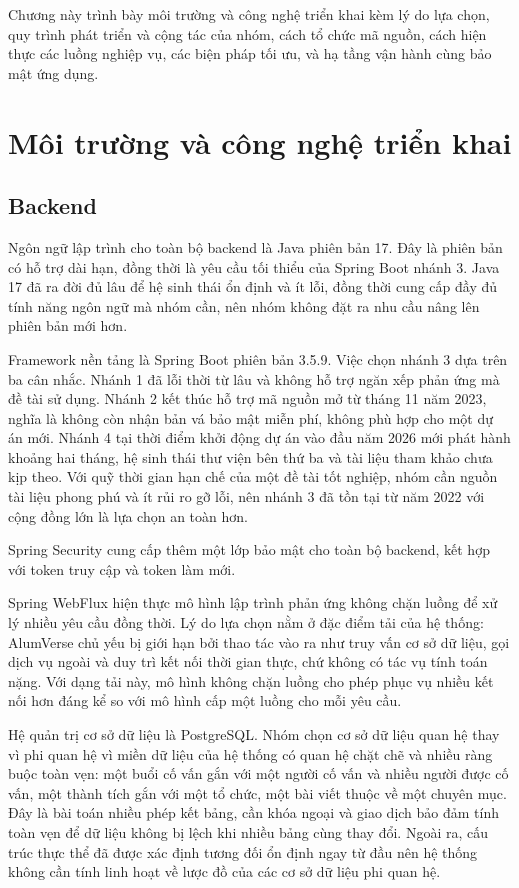 \documentclass[12pt,a4paper,oneside]{report}
\begin{document}
Chương này trình bày môi trường và công nghệ triển khai kèm lý do lựa chọn, quy trình phát triển và cộng tác của nhóm, cách tổ chức mã nguồn, cách hiện thực các luồng nghiệp vụ, các biện pháp tối ưu, và hạ tầng vận hành cùng bảo mật ứng dụng.

\section{Môi trường và công nghệ triển khai}

\subsection{Backend}

Ngôn ngữ lập trình cho toàn bộ backend là Java phiên bản 17. Đây là phiên bản có hỗ trợ dài hạn, đồng thời là yêu cầu tối thiểu của Spring Boot nhánh 3. Java 17 đã ra đời đủ lâu để hệ sinh thái ổn định và ít lỗi, đồng thời cung cấp đầy đủ tính năng ngôn ngữ mà nhóm cần, nên nhóm không đặt ra nhu cầu nâng lên phiên bản mới hơn.

Framework nền tảng là Spring Boot phiên bản 3.5.9. Việc chọn nhánh 3 dựa trên ba cân nhắc. Nhánh 1 đã lỗi thời từ lâu và không hỗ trợ ngăn xếp phản ứng mà đề tài sử dụng. Nhánh 2 kết thúc hỗ trợ mã nguồn mở từ tháng 11 năm 2023, nghĩa là không còn nhận bản vá bảo mật miễn phí, không phù hợp cho một dự án mới. Nhánh 4 tại thời điểm khởi động dự án vào đầu năm 2026 mới phát hành khoảng hai tháng, hệ sinh thái thư viện bên thứ ba và tài liệu tham khảo chưa kịp theo. Với quỹ thời gian hạn chế của một đề tài tốt nghiệp, nhóm cần nguồn tài liệu phong phú và ít rủi ro gỡ lỗi, nên nhánh 3 đã tồn tại từ năm 2022 với cộng đồng lớn là lựa chọn an toàn hơn.

Spring Security cung cấp thêm một lớp bảo mật cho toàn bộ backend, kết hợp với token truy cập và token làm mới.

Spring WebFlux hiện thực mô hình lập trình phản ứng không chặn luồng để xử lý nhiều yêu cầu đồng thời. Lý do lựa chọn nằm ở đặc điểm tải của hệ thống: AlumVerse chủ yếu bị giới hạn bởi thao tác vào ra như truy vấn cơ sở dữ liệu, gọi dịch vụ ngoài và duy trì kết nối thời gian thực, chứ không có tác vụ tính toán nặng. Với dạng tải này, mô hình không chặn luồng cho phép phục vụ nhiều kết nối hơn đáng kể so với mô hình cấp một luồng cho mỗi yêu cầu.

Hệ quản trị cơ sở dữ liệu là PostgreSQL. Nhóm chọn cơ sở dữ liệu quan hệ thay vì phi quan hệ vì miền dữ liệu của hệ thống có quan hệ chặt chẽ và nhiều ràng buộc toàn vẹn: một buổi cố vấn gắn với một người cố vấn và nhiều người được cố vấn, một thành tích gắn với một tổ chức, một bài viết thuộc về một chuyên mục. Đây là bài toán nhiều phép kết bảng, cần khóa ngoại và giao dịch bảo đảm tính toàn vẹn để dữ liệu không bị lệch khi nhiều bảng cùng thay đổi. Ngoài ra, cấu trúc thực thể đã được xác định tương đối ổn định ngay từ đầu nên hệ thống không cần tính linh hoạt về lược đồ của các cơ sở dữ liệu phi quan hệ.
\end{document}
